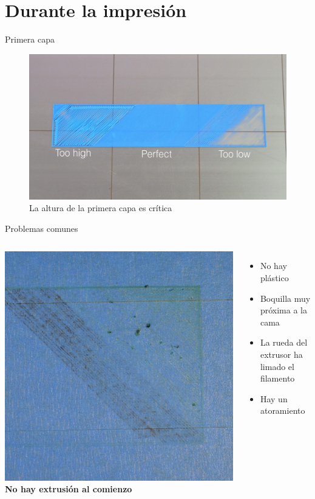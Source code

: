 \documentclass{beamer}
\begin{document}
	\section{Durante la impresión}
	\begin{frame}{Primera capa}
		\begin{figure}
			\includegraphics[width=\textwidth]{images/first_layer}
			\caption{La altura de la primera capa es crítica}
		\end{figure}
	\end{frame}
	\begin{frame}{Problemas comunes}
		\begin{columns}
				\includegraphics[width=\textwidth]{images/Not-Extruding-At-Start}
				\textbf{No hay extrusión al comienzo}
				\begin{itemize}
					\item No hay plástico
					\item Boquilla muy próxima a la cama
					\item La rueda del extrusor ha limado el filamento
					\item Hay un atoramiento
				\end{itemize}
		\end{columns}
	\end{frame}
\end{document}
